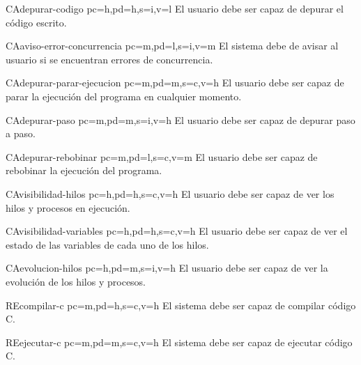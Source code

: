 \begin{userReq}{CA}{depurar-codigo}
    {pc=h,pd=h,s=i,v=l}
    El usuario debe ser capaz de \gls{depurar} el código escrito.
\end{userReq}

\begin{userReq}{CA}{aviso-error-concurrencia}
    {pc=m,pd=l,s=i,v=m}
    El sistema debe de avisar al usuario si se encuentran errores de \gls{concurrencia}.
\end{userReq}

\begin{userReq}{CA}{depurar-parar-ejecucion}
    {pc=m,pd=m,s=c,v=h}
    El usuario debe ser capaz de parar la ejecución del programa en cualquier momento.
\end{userReq}

\begin{userReq}{CA}{depurar-paso}
    {pc=m,pd=m,s=i,v=h}
    El usuario debe ser capaz de \gls{depurar} paso a paso.
\end{userReq}

\begin{userReq}{CA}{depurar-rebobinar}
    {pc=m,pd=l,s=c,v=m}
    El usuario debe ser capaz de rebobinar la ejecución del programa.
\end{userReq}

\begin{userReq}{CA}{visibilidad-hilos}
    {pc=h,pd=h,s=c,v=h}
    El usuario debe ser capaz de ver los \glspl{hilo} y procesos en ejecución.
\end{userReq}

\begin{userReq}{CA}{visibilidad-variables}
    {pc=h,pd=h,s=c,v=h}
    El usuario debe ser capaz de ver el estado de las variables de cada uno de los \glspl{hilo}.
\end{userReq}

\begin{userReq}{CA}{evolucion-hilos}
    {pc=h,pd=m,s=i,v=h}
    El usuario debe ser capaz de ver la evolución de los \glspl{hilo} y procesos.
\end{userReq}

\begin{userReq}{RE}{compilar-c}
    {pc=m,pd=h,s=c,v=h}
    El sistema debe ser capaz de compilar código C.
\end{userReq}

\begin{userReq}{RE}{ejecutar-c}
    {pc=m,pd=m,s=c,v=h}
    El sistema debe ser capaz de ejecutar código C.
\end{userReq}

